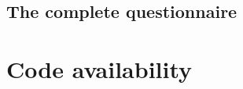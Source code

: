\documentclass{article}
\begin{document}
\subsection{The complete questionnaire}




\section{Code availability}



\end{document}
